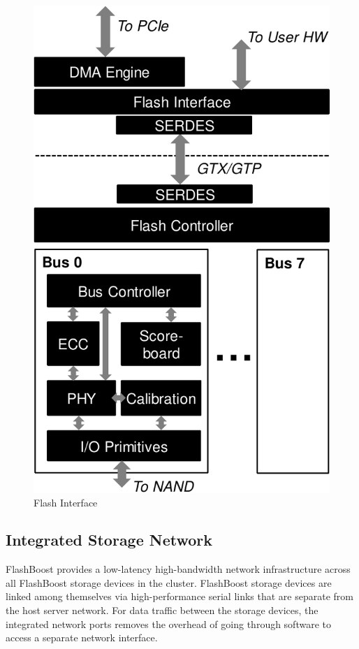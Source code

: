 \begin{figure}[h]
	\begin{center}
	\includegraphics[scale=0.4]{figures/top-arch-crop.pdf}
	\caption{Flash Interface}
	\label{fig:flashinterface}
	\end{center}
\end{figure}

\subsection{Integrated Storage Network}


FlashBoost provides a low-latency high-bandwidth network infrastructure across
all FlashBoost storage devices in the cluster.  FlashBoost storage devices are
linked among themselves via high-performance serial links that are separate from
the host server network. For data traffic between the storage devices, the
integrated network ports removes the overhead of going through software to
access a separate network interface.

